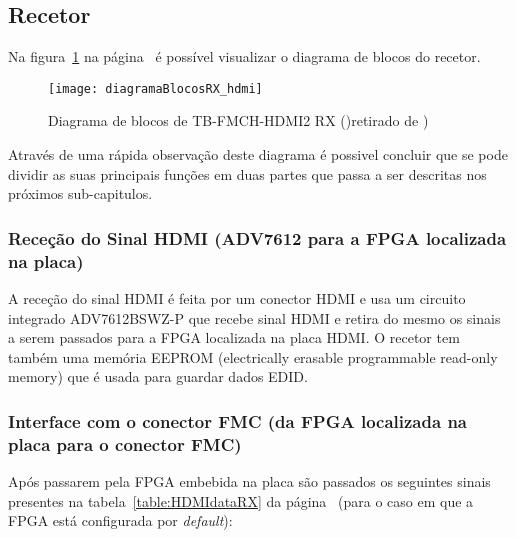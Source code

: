 \subsection{Recetor} \label{subsec:RX}

Na figura~\ref{fig:HDMIblocosRX} na página~\pageref{fig:HDMIblocosRX} é possível visualizar o diagrama de blocos do recetor.

\begin{figure}[h!]
	\begin{center}
		\leavevmode
		\texttt{[image: diagramaBlocosRX\_hdmi]}
		\caption[Diagrama de blocos de TB-FMCH-HDMI2 RX]{Diagrama de blocos de TB-FMCH-HDMI2 RX ()retirado de \cite{R009})}
		\label{fig:HDMIblocosRX}
	\end{center}
\end{figure}
Através  de uma rápida observação deste diagrama é possivel concluir que se pode dividir as suas principais funções em duas partes que passa a ser descritas nos próximos sub-capitulos. 

\subsubsection{Receção do Sinal HDMI (ADV7612 para a FPGA localizada na placa)}
	
A receção do sinal HDMI é feita por um conector HDMI e usa um circuito integrado ADV7612BSWZ-P que recebe sinal HDMI e retira do mesmo os sinais a serem passados para a FPGA localizada na placa HDMI. O recetor tem também uma memória EEPROM (electrically erasable programmable read-only memory) que é usada para guardar dados EDID.
	
\subsubsection{Interface com o conector FMC (da FPGA localizada na placa para o conector FMC)}

Após passarem pela FPGA embebida na placa são passados os seguintes sinais presentes na tabela~\ref{table:HDMIdataRX} da página~\pageref{table:HDMIdataRX} (para o caso em que a FPGA está configurada por \textit{default}):

